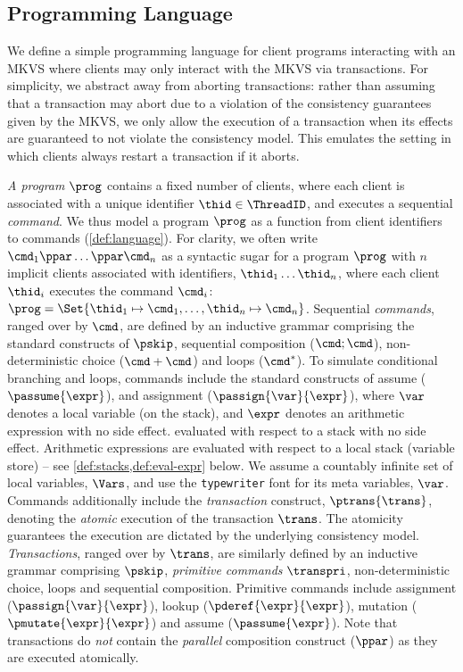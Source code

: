 \subsection{Programming Language}
We define a simple programming language for client programs interacting with an MKVS where clients may only interact with the MKVS via transactions. 
For simplicity, we abstract away from aborting transactions: rather than assuming that a transaction may abort due to a violation of the consistency guarantees given by the MKVS, we only allow the execution of a transaction when its effects are guaranteed to not violate the consistency model. This emulates the setting in which clients always restart a transaction if it aborts.
 
\emph{A program} \( \prog \) contains a fixed number of clients, where each client is associated with a unique identifier \( \thid \in \ThreadID \), and executes a sequential \emph{command}.
We thus model a program $\prog$ as a function from client identifiers  to commands (\cref{def:language}).
For clarity, we often write \( \cmd_{1}\ppar \dots \ppar \cmd_{n}\) as a syntactic sugar for a program \( \prog \) with $n$ implicit clients associated with identifiers, $\thid_1 \dots \thid_n$, where each client $\thid_i$ executes the command $\cmd_i$:  \( \prog = \Set{\thid_{1} \mapsto \cmd_{1}, \dots, \thid_{n} \mapsto \cmd_{n}  }\).
Sequential \emph{commands}, ranged over by $\cmd$, are defined by an inductive grammar comprising the standard constructs of $\pskip$, sequential composition ($\cmd; \cmd$), non-deterministic choice ($\cmd+\cmd$) and loops ($\cmd^*$).
To simulate conditional branching and loops, commands include the standard constructs of assume (\( \passume{\expr}\)), and assignment (\( \passign{\var}{\expr} \)), where \( \var \) denotes a local variable (on the stack), and \( \expr \) denotes an arithmetic expression with no side effect.  
evaluated with respect to a stack  with no side effect.
Arithmetic expressions are evaluated with respect to a local stack (variable store) -- see  \cref{def:stacks,def:eval-expr} below.
We assume a countably infinite set of local variables, $\Vars $, and use the \texttt{typewriter} font for its meta variables, \eg $\var$.\\
%
\indent Commands additionally include the \emph{transaction} construct, $\ptrans{\trans}$, denoting the \emph{atomic} execution of the transaction $\trans$. 
The atomicity guarantees the execution are dictated by the underlying consistency model.
\emph{Transactions}, ranged over by $\trans$, are similarly defined by an inductive grammar comprising $\pskip$, \emph{primitive commands} \( \transpri \), non-deterministic choice, loops and sequential composition.
Primitive commands include assignment (\( \passign{\var}{\expr}\)), lookup (\( \pderef{\expr}{\expr}\)), mutation (\( \pmutate{\expr}{\expr}\)) and assume (\( \passume{\expr}\)). 
Note that transactions do \emph{not} contain the \emph{parallel} composition construct ($\ppar$) as they are executed atomically.

